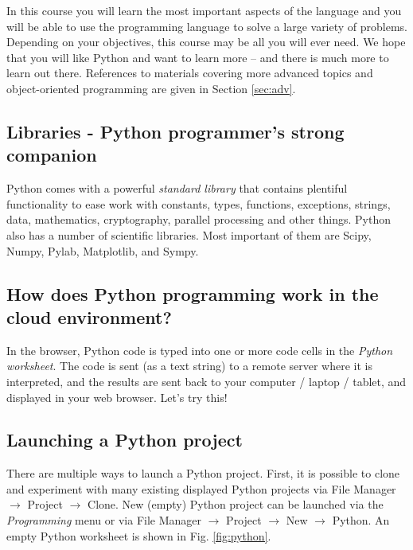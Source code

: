 \documentclass[article,A4,12pt]{llncs}
\begin{document}
In this course you will 
learn the most important aspects of the language and you will be able to 
use the programming language to solve a large variety of problems. 
Depending on your objectives, this course may be all you will ever need. 
We hope that you will like Python and want to learn more -- and there is much 
more to learn out there. References to materials covering more advanced topics 
and object-oriented programming are given in Section \ref{sec:adv}.

\subsection{Libraries - Python programmer's strong companion}

Python comes with a powerful {\em standard library} that contains plentiful functionality
to ease work with constants, types, functions, exceptions, strings, data, 
mathematics, cryptography, parallel processing and other things. 
Python also has a number of scientific libraries. Most important of them are Scipy, 
Numpy, Pylab, Matplotlib, and Sympy.

\subsection{How does Python programming work in the cloud environment?}

In the browser, Python code is typed into one or more code cells in the {\em Python worksheet}. 
The code is sent (as a text string) to a remote server where it is interpreted, and the 
results are sent back to your computer / laptop / tablet, and displayed in your web 
browser.  Let's try this!

\subsection{Launching a Python project}

There are multiple ways to launch a Python project. First, it is 
possible to clone and experiment with many existing displayed Python 
projects via File Manager $\rightarrow$ 
Project $\rightarrow$ Clone. New (empty) Python project can be launched via 
the {\em Programming} menu or via File Manager $\rightarrow$ 
Project $\rightarrow$ New $\rightarrow$ Python. An empty Python worksheet
is shown in Fig. \ref{fig:python}.
\end{document}
